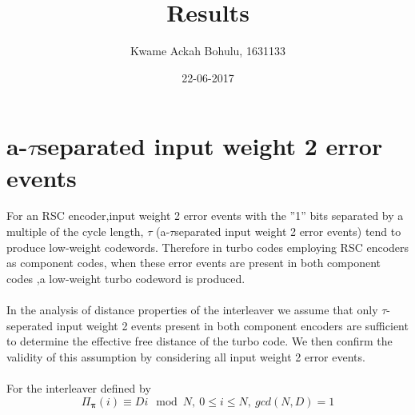 \documentclass[20 pts]{article}
\title{Results}
\author{Kwame Ackah Bohulu, 1631133}
\date{22-06-2017}
\begin{document}
\maketitle
\newpage
\section{a-$\tau$separated input weight 2 error events}
For an RSC encoder,input weight 2 error events with the  ''1'' bits separated by a 
multiple of the cycle length,
 $\tau$ (a-$\tau$separated input weight 2 error events) tend to produce low-weight 
 codewords. Therefore in turbo codes employing RSC encoders as component codes,
 when these error events are present in both component codes ,a low-weight 
 turbo codeword is produced.
 
 \paragraph{}
 In the analysis of distance properties of the interleaver we assume that only 
 $\tau$-seperated input weight 2 events present in both component encoders
 are sufficient to determine the effective free 
 distance of the turbo code. We then confirm the validity of this assumption by 
 considering all input weight 2 error events. 
 
 \paragraph{}
 For the interleaver defined by
 \begin{equation}
\Pi_{\mathbf{\pi}}(i) \equiv Di  \mod N, \ 0 \leq i \leq N, \ gcd(N,D)=1 
\label{two}
\end{equation}
\newpage
{}

\newpage

\end{document}
